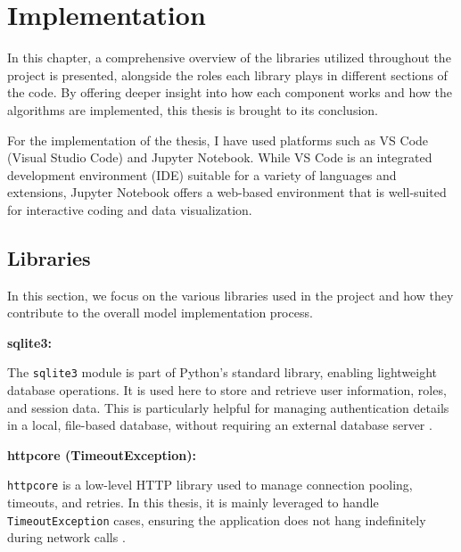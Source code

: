 \chapter{Implementation}

\label{Chapter4}


In this chapter, a comprehensive overview of the libraries utilized throughout the project is presented, 
alongside the roles each library plays in different sections of the code. By offering deeper insight 
into how each component works and how the algorithms are implemented, this thesis is brought to its conclusion.

For the implementation of the thesis, I have used platforms such as VS Code (Visual Studio Code) and Jupyter Notebook. 
While VS Code is an integrated development environment (IDE) suitable for a variety of languages and extensions, 
Jupyter Notebook offers a web-based environment that is well-suited for interactive coding and data visualization.


\vspace{1cm}
\section{Libraries}
In this section, we focus on the various libraries used in the project and how they contribute to the overall model implementation process.

\vspace{0.4cm}
\noindent\textbf{sqlite3:}

\noindent
The \texttt{sqlite3} module is part of Python’s standard library, enabling lightweight database operations. 
It is used here to store and retrieve user information, roles, and session data. This is particularly helpful 
for managing authentication details in a local, file-based database, without requiring an external database server \cite{pythonlibrary}.

\vspace{0.4cm}
\noindent\textbf{httpcore (TimeoutException):}

\noindent
\texttt{httpcore} is a low-level HTTP library used to manage connection pooling, timeouts, and retries. 
In this thesis, it is mainly leveraged to handle \texttt{TimeoutException} cases, ensuring the application 
does not hang indefinitely during network calls \cite{pythonlibrary}.

